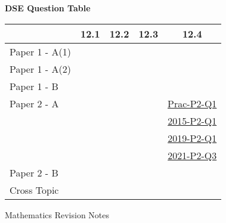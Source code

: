 \documentclass[12pt, a4paper]{article}
\begin{document}
\begin{absolutelynopagebreak}
\begin{center}
\textbf{DSE Question Table}
\end{center}
\begin{center}
\begin{tabular}{|l|c|c|c|c|}
\hline
        & 12.1 & 12.2 & 12.3 & 12.4 \\\hline
\hline
Paper 1 - A(1)&  &  &  &  \\
\hline
Paper 1 - A(2)&  &  &  &  \\
\hline
Paper 1 - B&  &  &  &  \\
\hline
\hline
Paper 2 - A&  &  &  & \hyperref[DSE2012P-CoreP2-Q01]{Prac-P2-Q1} \\
&  &  &  & \hyperref[DSE2015-CoreP2-Q01]{2015-P2-Q1} \\
&  &  &  & \hyperref[DSE2019-CoreP2-Q01]{2019-P2-Q1} \\
&  &  &  & \hyperref[DSE2021-CoreP2-Q03]{2021-P2-Q3} \\
\hline
Paper 2 - B&  &  &  &  \\
\hline
\hline
Cross Topic&  &  &  &  \\
\hline
\end{tabular}
\end{center}
\end{absolutelynopagebreak}
\newpage
\newpage
\thispagestyle{empty}
\begin{center}
Mathematics Revision Notes\\\vspace{1cm}
\\\vspace{1cm}
{\fontsize{24pt}{24pt}\selectfont {Introduction of Statistics and Statistical Diagrams}} \\\vspace{1cm}
\label{chapter:S1-13}

\end{center}
\vspace{0.5cm}
\hline
\end{document}
